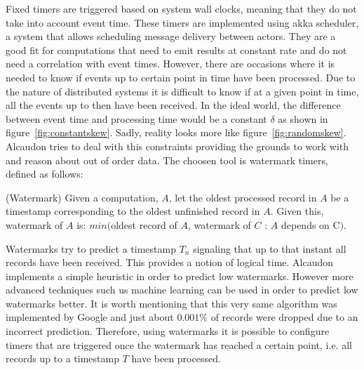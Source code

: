 Fixed timers are triggered based on system wall clocks, meaning that they do not
take into account event time. These timers are implemented using akka scheduler,
a system that allows scheduling message delivery between actors. They are a good
fit for computations that need to emit results at constant rate and do not need
a correlation with event times. However, there are occasions where it is needed
to know if events up to certain point in time have been processed. Due to the
nature of distributed systems it is difficult to know if at a given point in time,
all the events up to then have been received. In the ideal world, the
difference between event time and processing time would be a constant $\delta$ as
shown in figure~\ref{fig:constantskew}. Sadly, reality looks more
like figure~\ref{fig:randomskew}. Alcaudon tries to deal with this constraints
providing the grounds to work with and reason about out of order data. The choosen tool
is watermark timers, defined as follows:

\begin{definition}{(Watermark)}
Given a computation, $A$, let the oldest processed record in $A$ be a timestamp
corresponding to the oldest unfinished record in $A$.
Given this, watermark of $A$ is:
$min($oldest record of $A$, watermark of $C$ : $A$ depends on C$)$.
\end{definition}

Watermarks try to predict a timestamp $T_n$ signaling that up to that instant
all records have been received. This provides a notion of logical time. Alcaudon
implements a simple heuristic in order to predict low watermarks. However more
advanced techniques such us machine learning can be used in order to predict low
watermarks better. It is worth mentioning that this very same algorithm was
implemented by Google\cite{millwheel} and just about $0.001\%$ of records were
dropped due to an incorrect prediction. Therefore, using watermarks it is
possible to configure timers that are triggered once the watermark has reached a
certain point, i.e. all records up to a timestamp $T$ have been processed.

